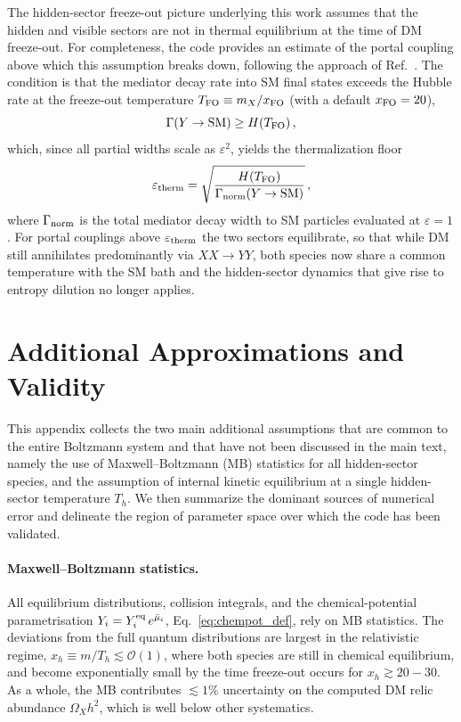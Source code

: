 \documentclass[11pt]{article}
\numberwithin{equation}{section}
\begin{document}
The hidden-sector freeze-out picture underlying this work assumes that the hidden and visible sectors are not in thermal equilibrium at the time of DM freeze-out. For completeness, the code provides an estimate of the portal coupling above which this assumption breaks down, following the approach of Ref.~\cite{Hu:2025thq}. The condition is that the mediator decay rate into SM final states exceeds the Hubble rate at the freeze-out temperature $T_{\rm FO}\equiv m_X/x_{\rm FO}$ (with a default $x_{\rm FO}=20$),
\begin{equation}
    \Gamma(Y\to\mathrm{SM}) \geq H(T_{\rm FO})\,,
\end{equation}
which, since all partial widths scale as $\varepsilon^2$, yields the thermalization floor
\begin{equation}
    \varepsilon_{\rm therm} = \sqrt{\frac{H(T_{\rm FO})}{\Gamma_{\rm norm}(Y\to\mathrm{SM})}}\,,
    \label{eq:eps_therm}
\end{equation}
where $\Gamma_{\rm norm}$ is the total mediator decay width to SM particles evaluated at $\varepsilon=1$. For portal couplings above $\varepsilon_{\rm therm}$ the two sectors equilibrate, so that while DM still annihilates predominantly via $XX\to YY$, both species now share a common temperature with the SM bath and the hidden-sector dynamics that give rise to entropy dilution no longer applies.

\appendix

\section{Additional Approximations and Validity}
\label{sec:assumptions}
 
This appendix collects the two main additional assumptions that are common to the entire Boltzmann system and that have not been discussed in the main text, namely the use of Maxwell–Boltzmann (MB) statistics for all hidden-sector species, and the assumption of internal kinetic equilibrium at a single hidden-sector temperature $T_h$. We then summarize the dominant sources of numerical error and delineate the region of parameter space over which the code has been validated.
 
\paragraph{Maxwell--Boltzmann statistics.}
All equilibrium distributions, collision integrals, and the chemical-potential parametrisation $Y_i = Y_i^{\rm eq}\,e^{\bar\mu_i}$, Eq.~\eqref{eq:chempot_def}, rely on MB statistics. The deviations from the full quantum distributions are largest in the relativistic regime, $x_h\equiv m/T_h \lesssim \mathcal{O}(1)$, where both species are still in chemical equilibrium, and become exponentially small by the time freeze-out occurs for $x_h\gtrsim 20-30$. As a whole, the MB contributes $\lesssim 1\%$ uncertainty on the computed DM relic abundance $\Omega_{X} h^2$, which is well below other systematics.
 
\end{document}
